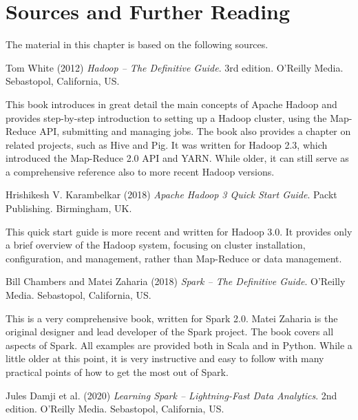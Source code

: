 \section*{Sources and Further Reading}

The material in this chapter is based on the following sources.

\begin{resourcebox}
Tom White (2012) \emph{Hadoop -- The Definitive Guide}. 3rd edition. O'Reilly Media. Sebastopol, California, US.
\end{resourcebox}

This book introduces in great detail the main concepts of Apache Hadoop and provides step-by-step introduction to setting up a Hadoop cluster, using the Map-Reduce API, submitting and managing jobs. The book also provides a chapter on related projects, such as Hive and Pig. It was written for Hadoop 2.3, which introduced the Map-Reduce 2.0 API and YARN. While older, it can still serve as a comprehensive reference also to more recent Hadoop versions.

\begin{resourcebox}
Hrishikesh V. Karambelkar (2018) \emph{Apache Hadoop 3 Quick Start Guide}. Packt Publishing. Birmingham, UK.
\end{resourcebox}

This quick start guide is more recent and written for Hadoop 3.0. It provides only a brief overview of the Hadoop system, focusing on cluster installation, configuration, and management, rather than Map-Reduce or data management.

\begin{resourcebox}
Bill Chambers and Matei Zaharia (2018) \emph{Spark -- The Definitive Guide}. O'Reilly Media. Sebastopol, California, US.
\end{resourcebox}

This is a very comprehensive book, written for Spark 2.0. Matei Zaharia is the original designer and lead developer of the Spark project. The book covers all aspects of Spark. All examples are provided both in Scala and in Python. While a little older at this point, it is very instructive and easy to follow with many practical points of how to get the most out of Spark.

\begin{resourcebox}
Jules Damji et al. (2020) \emph{Learning Spark -- Lightning-Fast Data Analytics}. 2nd edition. O'Reilly Media. Sebastopol, California, US.
\end{resourcebox}


